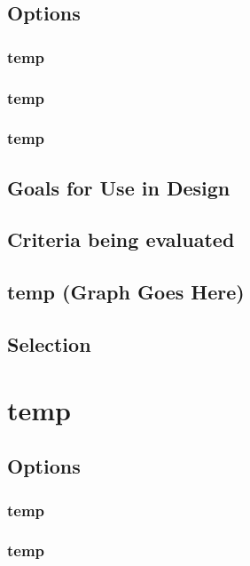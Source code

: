 \documentclass[10pt,letterpaper,onecolumn,journal]{IEEEtran}
\begin{document}
\subsection{Options}
\subsubsection{temp}

\subsubsection{temp}

\subsubsection{temp}

\subsection{Goals for Use in Design}

\subsection{Criteria being evaluated}

\subsection*{temp (Graph Goes Here)}

\subsection{Selection}

\section{temp}

\subsection{Options}
\subsubsection{temp}

\subsubsection{temp}
\end{document}
